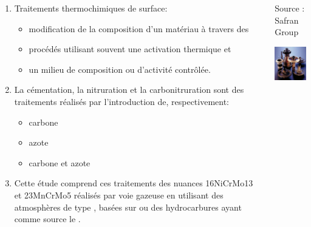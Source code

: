 \documentclass[aspectratio=169,pdf,t]{beamer}
\begin{document}
\begin{frame}{\insertsection}
  \begin{columns}[T]
    \begin{column}{0.61\textwidth}
      
      \begin{enumerate}
        \item \alert<1->{Traitements thermochimiques de surface:}
        \begin{itemize}
          \item \alert<1->{modification de la composition d'un matériau à travers des}
          \item \alert<1->{procédés utilisant souvent une activation thermique et}
          \item \alert<1->{un milieu de composition ou d'activité contrôlée.}
        \end{itemize}
        \vspace{0.3cm}
        
        \item \alert<2->{La cémentation, la nitruration et la carbonitruration sont des traitements réalisés par l'introduction de, respectivement:}
        \begin{itemize}
          \item \alert<2->{carbone}
          \item \alert<2->{azote}
          \item \alert<2->{carbone et azote}
        \end{itemize}
        \vspace{0.3cm}
        
        \item \alert<3->{Cette étude comprend ces traitements des nuances 16NiCrMo13 et 23MnCrMo5 réalisés par voie gazeuse en utilisant des atmosphères de type , basées sur  ou des hydrocarbures ayant comme source le .}
      \end{enumerate}
    \end{column}
    \begin{column}{0.39\textwidth}
      \centering{}
      Source : Safran Group
      
      \includegraphics[width=4cm]{figures/pignon.jpg}
      
      \vspace{0.6cm}
    \end{column}
  \end{columns}
\end{frame}
\end{document}
